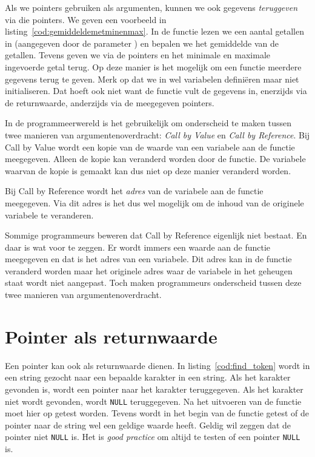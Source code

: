 Als we pointers gebruiken als argumenten, kunnen we ook gegevens \textsl{teruggeven} via die pointers. We geven een voorbeeld in listing~\ref{cod:gemiddeldemetminenmax}. In de functie  lezen we een aantal getallen in (aangegeven door de parameter ) en bepalen we het gemiddelde van de getallen. Tevens geven we via de pointers  en  het minimale en maximale ingevoerde getal terug. Op deze manier is het mogelijk om een functie meerdere gegevens terug te geven. Merk op dat we in  wel variabelen definiëren maar niet initialiseren. Dat hoeft ook niet want de functie vult de gegevens in, enerzijds via de returnwaarde, anderzijds via de meegegeven pointers. 


\begin{infobox}
%
In de programmeerwereld is het gebruikelijk om onderscheid te maken tussen twee manieren van argumentenoverdracht: \textsl{Call by Value} en \textsl{Call by Reference}. Bij Call by Value wordt een kopie van de waarde van een variabele aan de functie meegegeven. Alleen de kopie kan veranderd worden door de functie. De variabele waarvan de kopie is gemaakt kan dus niet op deze manier veranderd worden.

Bij Call by Reference wordt het \textsl{adres} van de variabele aan de functie meegegeven. Via dit adres is het dus wel mogelijk om de inhoud van de originele variabele te veranderen.

Sommige programmeurs beweren dat Call by Reference eigenlijk niet bestaat. En daar is wat voor te zeggen. Er wordt immers een waarde aan de functie meegegeven en dat is het adres van een variabele. Dit adres kan in de functie veranderd worden maar het originele adres waar de variabele in het geheugen staat wordt niet aangepast. Toch maken programmeurs onderscheid tussen deze twee manieren van argumentenoverdracht.
\end{infobox}


\section{Pointer als returnwaarde}
\label{sec:pointersalsreturnwaarde}
Een pointer kan ook als returnwaarde dienen. In listing~\ref{cod:find_token} wordt in een string gezocht naar een bepaalde karakter in een string. Als het karakter gevonden is, wordt een pointer naar het karakter teruggegeven. Als het karakter niet wordt gevonden, wordt \texttt{NULL} teruggegeven. Na het uitvoeren van de functie moet hier op getest worden. Tevens wordt in het begin van de functie getest of de pointer naar de string wel een geldige waarde heeft. Geldig wil zeggen dat de pointer niet \texttt{NULL} is. Het is \textsl{good practice} om altijd te testen of een pointer \texttt{NULL} is.


